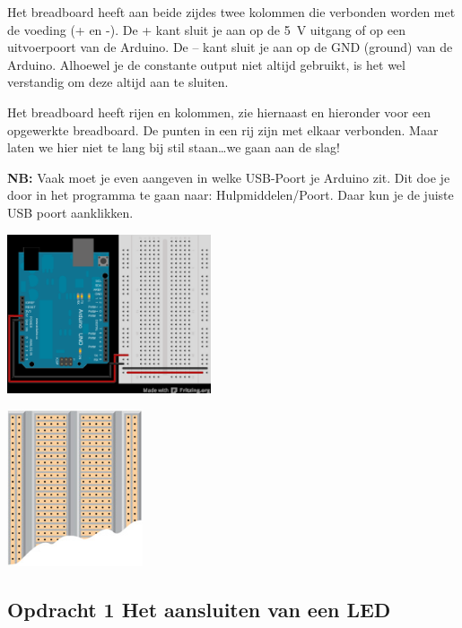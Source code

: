 \documentclass{arduino}
\begin{document}
\begin{minipage}[b]{0.6\textwidth}
Het breadboard heeft aan beide zijdes twee kolommen die verbonden worden met de voeding (+ en -). De + kant sluit je aan op de \SI{5}{\volt} uitgang of op een uitvoerpoort van de Arduino. De – kant sluit je aan op de GND (ground) van de Arduino. Alhoewel je de constante output niet altijd gebruikt, is het wel verstandig om deze altijd aan te sluiten.

Het breadboard heeft rijen en kolommen, zie hiernaast en hieronder voor een opgewerkte breadboard. De punten in een rij zijn met elkaar verbonden. Maar laten we hier niet te lang bij stil staan\dots we gaan aan de slag!

\textbf{NB:} Vaak moet je even aangeven in welke USB-Poort je Arduino zit. Dit doe je door in het programma te gaan naar: Hulpmiddelen/Poort. Daar kun je de juiste USB poort aanklikken.
\end{minipage}\hfill\begin{minipage}[b]{0.39\textwidth}
\raggedleft
\includegraphics[width=6cm]{3. Arduino - breadboard}

\includegraphics[width=4cm]{4. Breadboard}
\end{minipage}

\newpage

\subsection{Opdracht 1 Het aansluiten van een LED}
\end{document}
